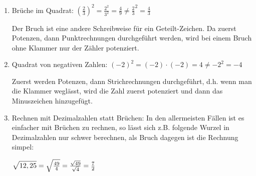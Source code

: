 \newpage
\begin{enumerate}[label=\arabic*)]
	\item Brüche im Quadrat: \(\left(\frac{2}{3}\right) ^2=\frac{2^2}{3^2}=\frac{4}{9}\neq\frac{2}{3}^2=\frac{4}{3}\)
	
	Der Bruch ist eine andere Schreibweise für ein Geteilt-Zeichen. Da zuerst Potenzen, dann Punktrechnungen durchgeführt werden, wird bei einem Bruch ohne Klammer nur der Zähler potenziert.
	
	\item Quadrat von negativen Zahlen: \(\left( -2\right) ^2=\left( -2\right) \cdot\left( -2\right) =4\neq-2^2=-4\)
	
	Zuerst werden Potenzen, dann Strichrechnungen durchgeführt, d.h. wenn man die Klammer weglässt, wird die Zahl zuerst potenziert und dann das Minuszeichen hinzugefügt.
	
	\item Rechnen mit Dezimalzahlen statt Brüchen: In den allermeisten Fällen ist es einfacher mit Brüchen zu rechnen, so lässt sich z.B. folgende Wurzel in Dezimalzahlen nur schwer berechnen, als Bruch dagegen ist die Rechnung simpel:
	
	\(\sqrt{12,25\vphantom{A^2}}=\sqrt{\frac{49}{4}}=\frac{\sqrt{49}}{\sqrt{4}}=\frac{7}{2}\)
\end{enumerate}